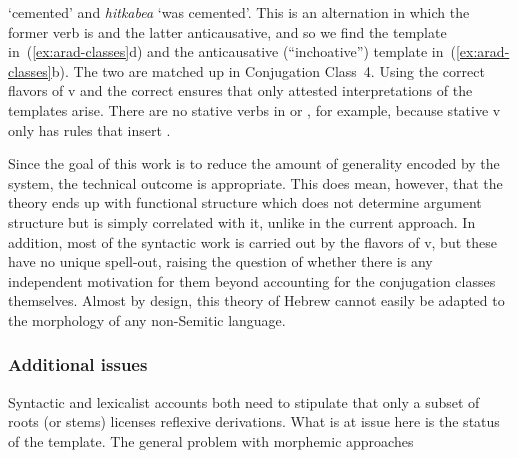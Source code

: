 \begin{exe}
\begin{xlist}
\begin{xlist}
\begin{exe}
\begin{xlist}
\begin{xlist}
\begin{exe}
\begin{xlist}
\begin{xlist}
\begin{exe}
\begin{exe}
\begin{xlist}
\begin{exe}
\begin{exe}
\begin{xlist}
\begin{exe}
\begin{exe}
\begin{exe}
\begin{exe}
\begin{exe}
\begin{xlist}
\begin{exe}
\begin{xlist}
\begin{exe}
\begin{exe}
\begin{xlist}
\begin{exe}
\begin{xlist}
\begin{exe}
\begin{xlist}
\begin{exe}
\begin{exe}
\begin{exe}
\begin{xlist}
\begin{exe}
\begin{exe}
\begin{exe}
\begin{xlist}
\begin{exe}
\begin{xlist}
\begin{exe}
\begin{exe}
\begin{xlist}
\begin{exe}
\begin{exe}
\begin{exe}
\begin{exe}
\begin{xlist}
\begin{exe}
\begin{xlist}
\begin{exe}
\begin{xlist}
\begin{exe}
\begin{xlist}
\begin{exe}
\begin{xlist}
\begin{exe}
\begin{xlist}
\begin{exe}
\begin{exe}
\begin{xlist}
\begin{exe}
\begin{xlist}
\begin{exe}
\begin{exe}
\begin{xlist}
\begin{exe}
\begin{xlist}
\begin{exe}
\begin{exe}
\begin{exe}
\begin{exe}
\begin{xlist}
\begin{xlist}
\begin{exe}
\begin{xlist}
\begin{exe}
\begin{exe}
\begin{exe}
\begin{xlist}
\begin{exe}
\begin{exe}
\begin{xlist}
\begin{exe}
\begin{exe}
\begin{exe}
\begin{xlist}
\begin{xlist}
\begin{exe}
\begin{xlist}
\begin{exe}
\begin{exe}
\begin{exe}
\begin{exe}
\begin{xlist}
\begin{exe}
\begin{xlist}
\begin{exe}
\begin{xlist}
\begin{exe}
\begin{xlist}
\begin{exe}
\begin{exe}
\begin{exe}
\begin{exe}
\begin{exe}
\begin{xlist}
\begin{exe}
\begin{xlist}
\begin{exe}
\begin{xlist}
\begin{xlist}
\begin{exe}
\begin{xlist}
\begin{exe}
\begin{xlist}
\begin{exe}
\begin{xlist}
\begin{exe}
\begin{xlist}
`cemented' and \emph{hitkabea} `was cemented'. This is an alternation in which the former verb is  and the latter anticausative, and so we find the  template in~(\ref{ex:arad-classes}d) and the anticausative (``inchoative'') template in~(\ref{ex:arad-classes}b). The two are matched up in Conjugation Class~4. Using the correct flavors of v and the correct  ensures that only attested interpretations of the templates arise. There are no stative verbs in {\tpie} or {\thit}, for example, because stative v only has rules that insert {\tkal}. 

Since the goal of this work is to reduce the amount of generality encoded by the system, the technical outcome is appropriate. This does mean, however, that the theory ends up with functional structure which does not determine argument structure but is simply correlated with it, unlike in the current approach. In addition, most of the syntactic work is carried out by the flavors of v, but these have no unique spell-out, raising the question of whether there is any independent motivation for them beyond accounting for the conjugation classes themselves. Almost by design, this theory of Hebrew cannot easily be adapted to the morphology of any non-Semitic language.

		\subsubsection{Additional issues}
Syntactic and lexicalist accounts both need to stipulate that only a subset of roots (or stems) licenses reflexive derivations. What is at issue here is the status of the template. The general problem with morphemic approaches 
\end{xlist}
\end{exe}
\end{xlist}
\end{exe}
\end{xlist}
\end{exe}
\end{xlist}
\end{exe}
\end{xlist}
\end{xlist}
\end{exe}
\end{xlist}
\end{exe}
\end{xlist}
\end{exe}
\end{exe}
\end{exe}
\end{exe}
\end{exe}
\end{xlist}
\end{exe}
\end{xlist}
\end{exe}
\end{xlist}
\end{exe}
\end{xlist}
\end{exe}
\end{exe}
\end{exe}
\end{exe}
\end{xlist}
\end{exe}
\end{xlist}
\end{xlist}
\end{exe}
\end{exe}
\end{exe}
\end{xlist}
\end{exe}
\end{exe}
\end{xlist}
\end{exe}
\end{exe}
\end{exe}
\end{xlist}
\end{exe}
\end{xlist}
\end{xlist}
\end{exe}
\end{exe}
\end{exe}
\end{exe}
\end{xlist}
\end{exe}
\end{xlist}
\end{exe}
\end{exe}
\end{xlist}
\end{exe}
\end{xlist}
\end{exe}
\end{exe}
\end{xlist}
\end{exe}
\end{xlist}
\end{exe}
\end{xlist}
\end{exe}
\end{xlist}
\end{exe}
\end{xlist}
\end{exe}
\end{xlist}
\end{exe}
\end{exe}
\end{exe}
\end{exe}
\end{xlist}
\end{exe}
\end{exe}
\end{xlist}
\end{exe}
\end{xlist}
\end{exe}
\end{exe}
\end{exe}
\end{xlist}
\end{exe}
\end{exe}
\end{exe}
\end{xlist}
\end{exe}
\end{xlist}
\end{exe}
\end{xlist}
\end{exe}
\end{exe}
\end{xlist}
\end{exe}
\end{xlist}
\end{exe}
\end{exe}
\end{exe}
\end{exe}
\end{exe}
\end{xlist}
\end{exe}
\end{exe}
\end{xlist}
\end{exe}
\end{exe}
\end{xlist}
\end{xlist}
\end{exe}
\end{xlist}
\end{xlist}
\end{exe}
\end{xlist}
\end{xlist}
\end{exe}
